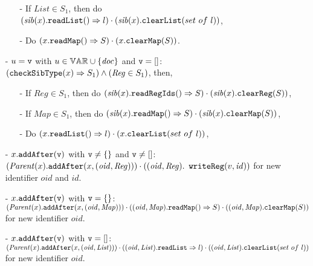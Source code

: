 \begin{itemize}
\begin{itemize}
    \item[-] If $\mathit{List} \in S_1$, then do $( \mathit{sib}(x).{\tt readList}()\Rightarrow l ) \cdot ( \mathit{sib}(x).{\tt clearList}(set \ of \ l) )$,

    \item[-] Do $( x.{\tt readMap}()\Rightarrow S ) \cdot ( x.{\tt clearMap}(S) )$.
    \end{itemize}

\item[-] $u = \mathtt{v}$ with $u \in \mathbb{VAR} \cup \{ \mathit{doc} \}$ and $\mathtt{v} = []$: $({\tt checkSibType}(x) \Rightarrow S_1) \wedge ( \mathit{Reg} \in S_1 )$, then,

    \begin{itemize}
    \setlength{\itemsep}{0.5pt}
    \item[-] If $\mathit{Reg} \in S_1$, then do $( \mathit{sib}(x).{\tt readRegIds}()\Rightarrow S ) \cdot ( \mathit{sib}(x).{\tt clearReg}(S) )$,

    \item[-] If $\mathit{Map} \in S_1$, then do $( \mathit{sib}(x).{\tt readMap}()\Rightarrow S ) \cdot ( \mathit{sib}(x).{\tt clearMap}(S) )$,

    \item[-] Do $( x.{\tt readList}()\Rightarrow l ) \cdot ( x.{\tt clearList}(set \ of \ l) )$,
    \end{itemize}

\item[-] $x.{\tt addAfter}(\mathtt{v})$ with $\mathtt{v} \neq \{\}$ and $\mathtt{v} \neq []$: $( \mathit{Parent}(x).{\tt addAfter}(x, ( \mathit{oid},\mathit{Reg} )) ) \cdot ( ( \mathit{oid},\mathit{Reg} ).$ ${\tt writeReg}( v,\mathit{id} ) )$ for new identifier $\mathit{oid}$ and $\mathit{id}$.

\item[-] $x.{\tt addAfter}(\mathtt{v})$ with $\mathtt{v} = \{\}$: $( \mathit{Parent}(x).{\tt addAfter}(x, ( \mathit{oid},\mathit{Map} )) ) \cdot ( ( \mathit{oid},\mathit{Map} ).{\tt readMap}()\Rightarrow S ) \cdot ( ( \mathit{oid},\mathit{Map} ).{\tt clearMap}(S) )$ for new identifier $\mathit{oid}$.

\item[-] $x.{\tt addAfter}(\mathtt{v})$ with $\mathtt{v} = []$: $( \mathit{Parent}(x).{\tt addAfter}(x, ( \mathit{oid},\mathit{List} )) ) \cdot ( ( \mathit{oid},\mathit{List} ).{\tt readList}\Rightarrow l ) \cdot ( ( \mathit{oid},\mathit{List} ).{\tt clearList}(set \ of \ l) )$ for new identifier $\mathit{oid}$.


\end{itemize}
